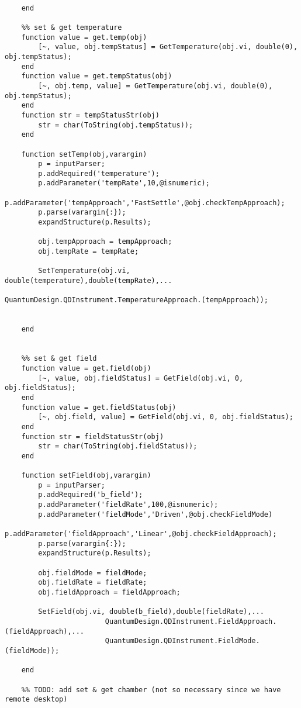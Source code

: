 \begin{lstlisting}
        
    end
    
    %% set & get temperature
    function value = get.temp(obj)
        [~, value, obj.tempStatus] = GetTemperature(obj.vi, double(0), obj.tempStatus);
    end
    function value = get.tempStatus(obj)
        [~, obj.temp, value] = GetTemperature(obj.vi, double(0), obj.tempStatus);
    end
    function str = tempStatusStr(obj)
        str = char(ToString(obj.tempStatus));
    end
    
    function setTemp(obj,varargin)
        p = inputParser;
        p.addRequired('temperature');
        p.addParameter('tempRate',10,@isnumeric);
        p.addParameter('tempApproach','FastSettle',@obj.checkTempApproach);
        p.parse(varargin{:});
        expandStructure(p.Results);
        
        obj.tempApproach = tempApproach;
        obj.tempRate = tempRate;
        
        SetTemperature(obj.vi, double(temperature),double(tempRate),...
                        QuantumDesign.QDInstrument.TemperatureApproach.(tempApproach));     
        
        
    end
    
    
    %% set & get field
    function value = get.field(obj)
        [~, value, obj.fieldStatus] = GetField(obj.vi, 0, obj.fieldStatus);
    end
    function value = get.fieldStatus(obj)
        [~, obj.field, value] = GetField(obj.vi, 0, obj.fieldStatus);
    end
    function str = fieldStatusStr(obj)
        str = char(ToString(obj.fieldStatus));
    end
    
    function setField(obj,varargin)
        p = inputParser;
        p.addRequired('b_field');
        p.addParameter('fieldRate',100,@isnumeric);
        p.addParameter('fieldMode','Driven',@obj.checkFieldMode)
        p.addParameter('fieldApproach','Linear',@obj.checkFieldApproach);
        p.parse(varargin{:});
        expandStructure(p.Results);
        
        obj.fieldMode = fieldMode;
        obj.fieldRate = fieldRate;
        obj.fieldApproach = fieldApproach;
        
        SetField(obj.vi, double(b_field),double(fieldRate),...
                        QuantumDesign.QDInstrument.FieldApproach.(fieldApproach),...
                        QuantumDesign.QDInstrument.FieldMode.(fieldMode));         
        
    end
    
    %% TODO: add set & get chamber (not so necessary since we have remote desktop)
    

\end{lstlisting}
